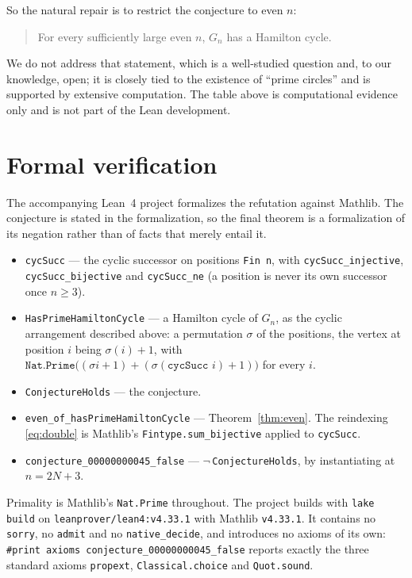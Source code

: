 \documentclass[11pt]{article}
\theoremstyle{plain}
\theoremstyle{remark}
\begin{document}
So the natural repair is to restrict the conjecture to even $n$:

\begin{quote}
For every sufficiently large even $n$, $G_n$ has a Hamilton cycle.
\end{quote}

We do not address that statement, which is a well-studied question and, to our
knowledge, open; it is closely tied to the existence of ``prime circles'' and
is supported by extensive computation. The table above is computational
evidence only and is not part of the Lean development.

\section{Formal verification}

The accompanying Lean~4 project formalizes the refutation against Mathlib. The
conjecture is stated in the formalization, so the final theorem is a
formalization of its negation rather than of facts that merely entail it.

\begin{itemize}
  \item \texttt{cycSucc} --- the cyclic successor on positions \texttt{Fin n},
    with \texttt{cycSucc\_injective}, \texttt{cycSucc\_bijective} and
    \texttt{cycSucc\_ne} (a position is never its own successor once $n\ge3$).
  \item \texttt{HasPrimeHamiltonCycle} --- a Hamilton cycle of $G_n$, as the
    cyclic arrangement described above: a permutation $\sigma$ of the positions,
    the vertex at position $i$ being $\sigma(i)+1$, with
    $\texttt{Nat.Prime}\bigl((\sigma i+1)+(\sigma(\texttt{cycSucc } i)+1)\bigr)$
    for every $i$.
  \item \texttt{ConjectureHolds} --- the conjecture.
  \item \texttt{even\_of\_hasPrimeHamiltonCycle} --- Theorem~\ref{thm:even}.
    The reindexing \eqref{eq:double} is Mathlib's
    \texttt{Fintype.sum\_bijective} applied to \texttt{cycSucc}.
  \item \texttt{conjecture\_00000000045\_false} ---
    $\lnot$\,\texttt{ConjectureHolds}, by instantiating at $n=2N+3$.
\end{itemize}

Primality is Mathlib's \texttt{Nat.Prime} throughout. The project builds with
\texttt{lake build} on \texttt{leanprover/lean4:v4.33.1} with Mathlib
\texttt{v4.33.1}. It contains no \texttt{sorry}, no \texttt{admit} and no
\texttt{native\_decide}, and introduces no axioms of its own:
\texttt{\#print axioms conjecture\_00000000045\_false} reports exactly the
three standard axioms \texttt{propext}, \texttt{Classical.choice} and
\texttt{Quot.sound}.
\end{document}
